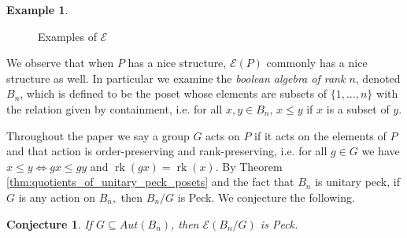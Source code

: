 \documentclass[10 pt]{amsart}
\theoremstyle{plain}
\newtheorem{conjecture}[thm]{Conjecture}
\theoremstyle{definition}
\newtheorem{eg}[thm]{Example}
\theoremstyle{remark}
\numberwithin{equation}{section}
\renewcommand{\iff}{\Leftrightarrow}
\newcommand\rk{\operatorname{rk}}
\begin{document}
\begin{eg}
\begin{figure}[h!]
\begin{center}
\iffalse
\newline
\begin{tikzpicture}[scale=.7]
  \node (one) at (90:2cm) {$6$};
  \node (b) at (150:2cm) {$4$};
  \node (a) at (210:2cm) {$2$};
  \node (zero) at (270:2cm) {$1$};
  \node (c) at (330:2cm) {$3$};
  \node (d) at (30:2cm) {$5$};
  \draw (zero) -- (a) -- (b) -- (one) -- (d) -- (c) -- (zero);
\end{tikzpicture}
\begin{tikzpicture}[scale=.7]
  \node (one) at (60:2cm) {$(5, 6)$};
  \node (b) at (120:2cm) {$(4, 6)$};
  \node (a) at (180:2cm) {$(2, 4)$};
  \node (zero) at (240:2cm) {$(1, 2)$};
  \node (c) at (300:2cm) {$(1,3)$};
  \node (d) at (0:2cm) {$(3, 5)$};
  \draw (zero) -- (a) -- (b);
  \draw (c)--(d)--(one);
\end{tikzpicture}
\begin{tikzpicture}[scale=.7]
  \node (one) at (60:2cm) {$(5, 6)$};
  \node (b) at (120:2cm) {$(4, 6)$};
  \node (a) at (180:2cm) {$(2, 4)$};
  \node (zero) at (240:2cm) {$(1, 2)$};
  \node (c) at (300:2cm) {$(1, 3)$};
  \node (d) at (0:2cm) {$(3, 5)$};
  \draw (zero) -- (a) -- (b) -- (c)--(d)--(one) -- (zero);
\end{tikzpicture}
\fi
\caption{\label{fig:EP_definition_example}Examples of $\mathcal E$}
\end{center}
\end{figure}
\end{eg}


We observe that when $P$ has a nice structure, $\mathcal E(P)$ commonly has a nice structure as well.  In particular we examine the \textit{boolean algebra of rank $n$}, denoted $B_n$, which is defined to be the poset whose elements are subsets of $\{1,\ldots,n\}$ with the relation given by containment, i.e. for all $x,y\in B_n$, $x\le y$ if $x$ is a subset of $y$.

Throughout the paper we say a group $G$ acts on $P$ if it acts on the elements of $P$ and that action is order-preserving and rank-preserving, i.e. for all $g \in G$ we have $x \leq y \iff gx \leq gy$ and $\rk(gx) = \rk(x)$.  By Theorem \ref{thm:quotients_of_unitary_peck_posets} and the fact that $B_n$ is unitary peck, if $G$ is any action on $B_n,$ then $B_n/G$ is Peck.  We conjecture the following.

\begin{conjecture}\label{conj:F_of_BnG_Peck}
If $G \subseteq Aut(B_n)$, then $\mathcal E(B_n/G)$ is Peck.
\end{conjecture}
\end{document}
